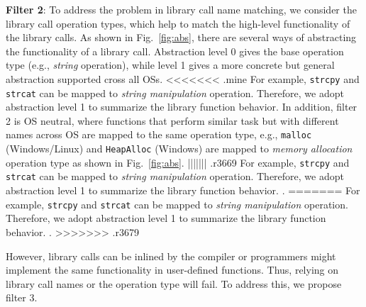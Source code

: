 \textbf{Filter 2}: To address the problem in library call name matching, we consider the library call operation types, which help to match the high-level functionality of the library calls. As shown in Fig.~\ref{fig:abs}, there are several ways of abstracting the functionality of a library call. Abstraction level 0 gives the base operation type (e.g., \textit{string} operation), while level 1 gives a more concrete but general abstraction supported cross all OSs.
<<<<<<< .mine
For example, \texttt{strcpy} and \texttt{strcat} can be mapped to \textit{string manipulation} operation. Therefore, we adopt abstraction level 1 to summarize the library function behavior. In addition, filter 2 is OS neutral, where functions that perform similar task but with different names across OS are mapped to the same operation type, e.g., \texttt{malloc} (Windows/Linux) and \texttt{HeapAlloc} (Windows) are mapped to \emph{memory allocation} operation type as shown in Fig.~\ref{fig:abs}.  
||||||| .r3669
For example, \texttt{strcpy} and \texttt{strcat} can be mapped to \textit{string manipulation} operation. Therefore, we adopt abstraction level 1 to summarize the library function behavior. .  
=======
For example, \texttt{strcpy} and \texttt{strcat} can be mapped to \textit{string manipulation} operation. Therefore, we adopt abstraction level 1 to summarize the library function behavior. .
>>>>>>> .r3679

However, library calls can be inlined by the compiler or programmers might implement the same functionality in user-defined functions. Thus, relying on library call names or the operation type will fail. To address this, we propose filter 3.%


